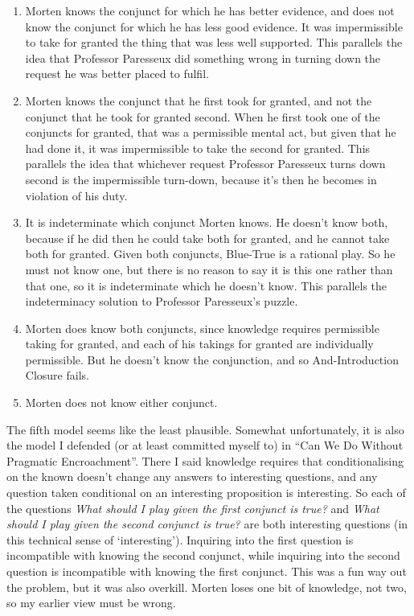 \documentclass[
  10pt,
  letterpaper,
  twoside]{scrbook}
\providecommand{\tightlist}{%
  \setlength{\itemsep}{0pt}\setlength{\parskip}{0pt}}\usepackage{longtable,booktabs,array}
\begin{document}
\begin{enumerate}
\def\labelenumi{\arabic{enumi}.}
\tightlist
\item
  Morten knows the conjunct for which he has better evidence, and does
  not know the conjunct for which he has less good evidence. It was
  impermissible to take for granted the thing that was less well
  supported. This parallels the idea that Professor Paresseux did
  something wrong in turning down the request he was better placed to
  fulfil.
\item
  Morten knows the conjunct that he first took for granted, and not the
  conjunct that he took for granted second. When he first took one of
  the conjuncts for granted, that was a permissible mental act, but
  given that he had done it, it was impermissible to take the second for
  granted. This parallels the idea that whichever request Professor
  Paresseux turns down second is the impermissible turn-down, because
  it's then he becomes in violation of his duty.
\item
  It is indeterminate which conjunct Morten knows. He doesn't know both,
  because if he did then he could take both for granted, and he cannot
  take both for granted. Given both conjuncts, Blue-True is a rational
  play. So he must not know one, but there is no reason to say it is
  this one rather than that one, so it is indeterminate which he doesn't
  know. This parallels the indeterminacy solution to Professor
  Paresseux's puzzle.
\item
  Morten does know both conjuncts, since knowledge requires permissible
  taking for granted, and each of his takings for granted are
  individually permissible. But he doesn't know the conjunction, and so
  And-Introduction Closure fails.
\item
  Morten does not know either conjunct.
\end{enumerate}

The fifth model seems like the least plausible. Somewhat unfortunately,
it is also the model I defended (or at least committed myself to) in
``Can We Do Without Pragmatic Encroachment''. There I said knowledge
requires that conditionalising on the known doesn't change any answers
to interesting questions, and any question taken conditional on an
interesting proposition is interesting. So each of the questions
\emph{What should I play given the first conjunct is true?} and
\emph{What should I play given the second conjunct is true?} are both
interesting questions (in this technical sense of `interesting').
Inquiring into the first question is incompatible with knowing the
second conjunct, while inquiring into the second question is
incompatible with knowing the first conjunct. This was a fun way out the
problem, but it was also overkill. Morten loses one bit of knowledge,
not two, so my earlier view must be wrong.
\end{document}
